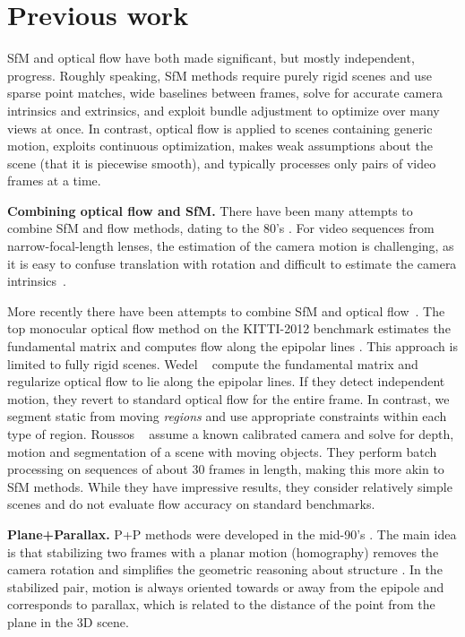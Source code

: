 \documentclass[10pt,twocolumn,letterpaper]{article}
\begin{document}
 \section{Previous work}
\noindent
SfM and optical flow have both made significant, but mostly independent, progress.
Roughly speaking, SfM methods require purely rigid scenes and use sparse point matches, wide
baselines between frames, solve for accurate camera intrinsics
and extrinsics, and exploit bundle adjustment to optimize over many
views at once. 
In contrast, optical flow is applied to scenes containing generic motion,
exploits continuous optimization, makes weak
assumptions about the scene (\eg that it is piecewise smooth),
and typically processes only pairs of video frames at a time.

{\bf Combining optical flow and SfM.}
There have been many attempts to combine SfM and flow methods,
dating to the 80's \cite{HeegerJepson:1992}.
For video sequences from narrow-focal-length
lenses, the estimation of the camera motion is challenging, 
as it is easy to confuse translation with rotation
and difficult to estimate the camera intrinsics~\cite{direct}.

More recently there have been attempts to combine SfM and
optical flow~\cite{Bai:2016:SemanticDeepFlow,Oisel:1998:SPIE,Valgaerts:2009:DAGM,Wedel:2009:ICCV,Yamaguchi:2013:Epipolarflow}.
The top monocular optical flow method on the KITTI-2012
benchmark estimates the fundamental matrix and computes flow along the
epipolar lines \cite{Yamaguchi:2013:Epipolarflow}.
This approach is limited to fully rigid scenes.
Wedel \etal~\cite{Wedel:2009:ICCV} compute the fundamental matrix and
regularize optical flow to lie along the epipolar lines.
If they detect independent motion, they revert to standard optical flow for the entire frame.
In contrast, we segment static from moving {\em regions} and use appropriate constraints within each type of region.
Roussos \etal~\cite{Roussos:2012:ISMAR} assume a known calibrated camera and solve for depth, motion and segmentation of a scene with moving objects.  They perform batch
processing on sequences of about 30 frames in length, making this more
akin to SfM methods.  While they have impressive results, they consider relatively
simple scenes and do not evaluate flow accuracy on
standard benchmarks.

{\bf Plane+Parallax.}
P+P methods were developed in the mid-90's
\cite{Irani:2002:MultiFramePPP,Sawhney:1994:3DGeometryPPP}.
The main idea is that stabilizing two frames with a planar motion
(homography) removes the camera rotation and simplifies the
geometric reasoning about structure \cite{Irani:PAMI:1997,Triggs:2000:ECCV}.
In the stabilized pair, motion is always oriented towards or away from the epipole
and corresponds to parallax, which is related to the distance of the point
from the plane in the 3D scene.
\end{document}
